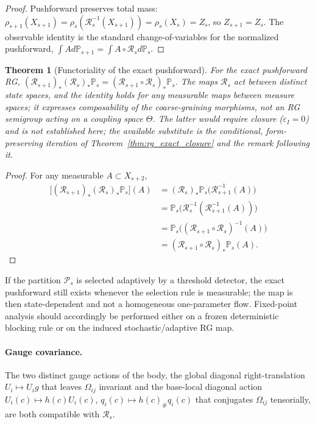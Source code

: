 \documentclass[11pt]{article}
\newtheorem{theorem}{Theorem}
\begin{document}
\begin{proof}
Pushforward preserves total mass: $\rho_{s+1}(X_{s+1}) = \rho_s(\mathcal{R}_s^{-1}(X_{s+1})) = \rho_s(X_s) = Z_s$, so $Z_{s+1} = Z_s$. The observable identity is the standard change-of-variables for the normalized pushforward, $\int A  d\mathbb{P}_{s+1} = \int A\circ\mathcal{R}_s  d\mathbb{P}_s$.
\end{proof}

\begin{theorem}[Functoriality of the exact pushforward]
\label{thm:rg_semigroup}
For the exact pushforward RG, $(\mathcal{R}_{s+1})_*(\mathcal{R}_s)_*\mathbb{P}_s = (\mathcal{R}_{s+1} \circ \mathcal{R}_s)_*\mathbb{P}_s$. The maps $\mathcal{R}_s$ act between distinct state spaces, and the identity holds for any measurable maps between measure spaces; it expresses composability of the coarse-graining morphisms, not an RG semigroup acting on a coupling space $\Theta$. The latter would require closure ($\varepsilon_I = 0$) and is not established here; the available substitute is the conditional, form-preserving iteration of Theorem~\ref{thm:rg_exact_closure} and the remark following it.
\end{theorem}

\begin{proof}
For any measurable $A \subset X_{s+2}$,
\begin{align*}
\big[(\mathcal{R}_{s+1})_*(\mathcal{R}_s)_*\mathbb{P}_s\big](A)
 &= (\mathcal{R}_s)_*\mathbb{P}_s\big(\mathcal{R}_{s+1}^{-1}(A)\big) \\
 &= \mathbb{P}_s\big(\mathcal{R}_s^{-1}(\mathcal{R}_{s+1}^{-1}(A))\big) \\
 &= \mathbb{P}_s\big((\mathcal{R}_{s+1} \circ \mathcal{R}_s)^{-1}(A)\big) \\
 &= (\mathcal{R}_{s+1} \circ \mathcal{R}_s)_*\mathbb{P}_s(A).
\end{align*}
\end{proof}

If the partition $\mathcal{P}_s$ is selected adaptively by a threshold detector, the exact pushforward still exists whenever the selection rule is measurable; the map is then state-dependent and not a homogeneous one-parameter flow. Fixed-point analysis should accordingly be performed either on a frozen deterministic blocking rule or on the induced stochastic/adaptive RG map.

\paragraph{Gauge covariance.}
The two distinct gauge actions of the body, the global diagonal right-translation $U_i \mapsto U_i g$ that leaves $\Omega_{ij}$ invariant and the base-local diagonal action $U_i(c) \mapsto h(c) U_i(c)$, $q_i(c) \mapsto h(c)_\# q_i(c)$ that conjugates $\Omega_{ij}$ tensorially, are both compatible with $\mathcal{R}_s$.
\end{document}
